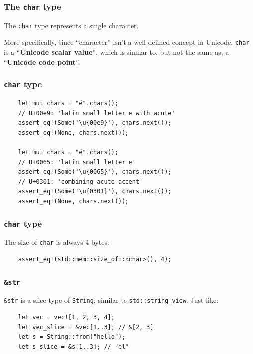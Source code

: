 \documentclass[aspectratio=1610,t]{beamer}
\begin{document}

\begin{frame}[fragile]
\frametitle{The \texttt{char} type}
The \texttt{char} type represents a single character.

More specifically, since ``character'' isn’t a well-defined concept in Unicode, \texttt{char} is a ``\textbf{Unicode scalar value}'', which is similar to, but not the same as, a ``\textbf{Unicode code point}''.
\end{frame}


\begin{frame}[fragile]
\frametitle{\texttt{char} type}
\begin{verbatim}
    let mut chars = "é".chars();
    // U+00e9: 'latin small letter e with acute'
    assert_eq!(Some('\u{00e9}'), chars.next());
    assert_eq!(None, chars.next());

    let mut chars = "é".chars();
    // U+0065: 'latin small letter e'
    assert_eq!(Some('\u{0065}'), chars.next());
    // U+0301: 'combining acute accent'
    assert_eq!(Some('\u{0301}'), chars.next());
    assert_eq!(None, chars.next());
\end{verbatim}
\end{frame}


\begin{frame}[fragile]
\frametitle{\texttt{char} type}
The size of \texttt{char} is always 4 bytes:

\begin{verbatim}
    assert_eq!(std::mem::size_of::<char>(), 4);
\end{verbatim}
\end{frame}


\begin{frame}[fragile]
\frametitle{\texttt{\&str}}
\texttt{\&str} is a slice type of \texttt{String}, similar to \texttt{std::string\_view}. Just like:

\begin{verbatim}
    let vec = vec![1, 2, 3, 4];
    let vec_slice = &vec[1..3]; // &[2, 3]
    let s = String::from("hello");
    let s_slice = &s[1..3]; // "el"
\end{verbatim}
\end{frame}
\end{document}

